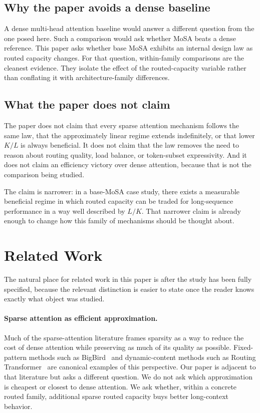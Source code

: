 \documentclass[11pt]{article}
\begin{document}
\subsection{Why the paper avoids a dense baseline}

A dense multi-head attention baseline would answer a different question from the one posed here. Such a comparison would ask whether MoSA beats a dense reference. This paper asks whether base MoSA exhibits an internal design law as routed capacity changes. For that question, within-family comparisons are the cleanest evidence. They isolate the effect of the routed-capacity variable rather than conflating it with architecture-family differences.

\subsection{What the paper does not claim}

The paper does not claim that every sparse attention mechanism follows the same law, that the approximately linear regime extends indefinitely, or that lower $K/L$ is always beneficial. It does not claim that the law removes the need to reason about routing quality, load balance, or token-subset expressivity. And it does not claim an efficiency victory over dense attention, because that is not the comparison being studied.

The claim is narrower: in a base-MoSA case study, there exists a measurable beneficial regime in which routed capacity can be traded for long-sequence performance in a way well described by $L/K$. That narrower claim is already enough to change how this family of mechanisms should be thought about.

\section{Related Work}

The natural place for related work in this paper is after the study has been fully specified, because the relevant distinction is easier to state once the reader knows exactly what object was studied.

\paragraph{Sparse attention as efficient approximation.}
Much of the sparse-attention literature frames sparsity as a way to reduce the cost of dense attention while preserving as much of its quality as possible. Fixed-pattern methods such as BigBird~\cite{bigbird} and dynamic-content methods such as Routing Transformer~\cite{routing_transformer} are canonical examples of this perspective. Our paper is adjacent to that literature but asks a different question. We do not ask which approximation is cheapest or closest to dense attention. We ask whether, within a concrete routed family, additional sparse routed capacity buys better long-context behavior.
\end{document}
